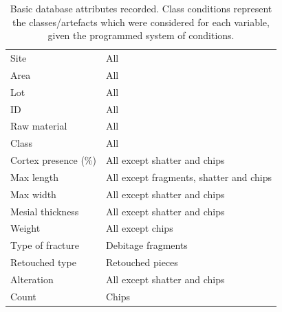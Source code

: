 \documentclass[12pt,twoside]{reedthesis}
\begin{document}
\begin{table}

\caption{\label{tab:basicdb}Basic database attributes recorded. Class conditions represent the classes/artefacts which were considered for each variable, given the programmed system of conditions.}
\centering
\fontsize{9}{11}\selectfont
\begin{tabular}[t]{>{\raggedright\arraybackslash}p{5cm}>{\raggedright\arraybackslash}p{5cm}}
\toprule
\multicolumn{1}{>{\centering\arraybackslash}p{5cm}}{\textbf{Recorded variables}} & \multicolumn{1}{>{\centering\arraybackslash}p{5cm}}{\textbf{Class conditions}}\\
\midrule
Site & All\\
Area & All\\
Lot & All\\
ID & All\\
Raw material & All\\
\addlinespace
Class & All\\
Cortex presence (\%) & All except shatter and chips\\
Max length & All except fragments, shatter and chips\\
Max width & All except shatter and chips\\
Mesial thickness & All except shatter and chips\\
\addlinespace
Weight & All except chips\\
Type of fracture & Debitage fragments\\
Retouched type & Retouched pieces\\
Alteration & All except shatter and chips\\
Count & Chips\\
\bottomrule
\end{tabular}
\end{table}
\begingroup\fontsize{9}{11}\selectfont
\end{document}

